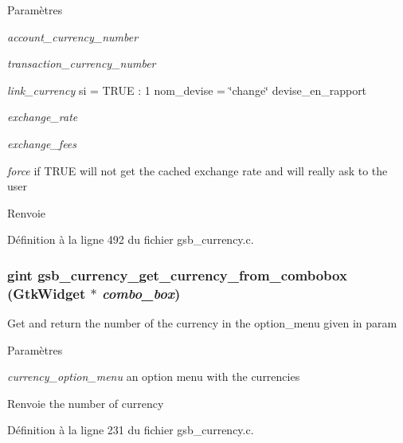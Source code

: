 \begin{DoxyParams}{Paramètres}
\item[{\em account\_\-currency\_\-number}]\item[{\em transaction\_\-currency\_\-number}]\item[{\em link\_\-currency}]si = TRUE : 1 nom\_\-devise = \char`\"{}change\char`\"{} devise\_\-en\_\-rapport \item[{\em exchange\_\-rate}]\item[{\em exchange\_\-fees}]\item[{\em force}]if TRUE will not get the cached exchange rate and will really ask to the user\end{DoxyParams}
\begin{DoxyReturn}{Renvoie}

\end{DoxyReturn}


Définition à la ligne 492 du fichier gsb\_\-currency.c.

\subsubsection[{gsb\_\-currency\_\-get\_\-currency\_\-from\_\-combobox}]{\setlength{\rightskip}{0pt plus 5cm}gint gsb\_\-currency\_\-get\_\-currency\_\-from\_\-combobox (GtkWidget $\ast$ {\em combo\_\-box})}\label{gsb__currency_8c_a3abd39af3aafa4213a8ffbe74d5d6b10}
Get and return the number of the currency in the option\_\-menu given in param


\begin{DoxyParams}{Paramètres}
\item[{\em currency\_\-option\_\-menu}]an option menu with the currencies\end{DoxyParams}
\begin{DoxyReturn}{Renvoie}
the number of currency 
\end{DoxyReturn}


Définition à la ligne 231 du fichier gsb\_\-currency.c.


